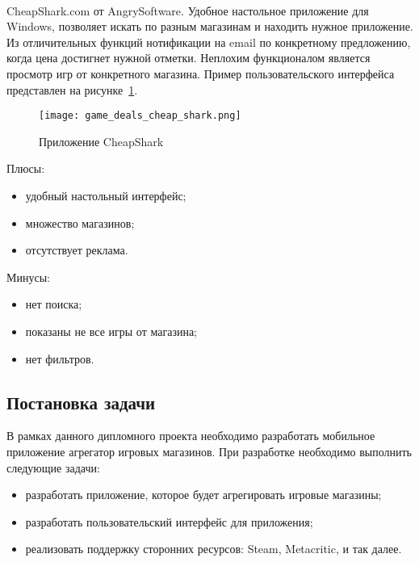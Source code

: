 ~\par
CheapShark.com от AngrySoftware. Удобное настольное приложение для Windows, позволяет искать по разным магазинам и находить нужное приложение. Из отличительных функций нотификации на email по конкретному предложению, когда цена достигнет нужной отметки. Неплохим функционалом является просмотр игр от конкретного магазина. Пример пользовательского интерфейса представлен на рисунке~\ref{fig:domain:game_cheap_shark}.

\begin{figure}[H]
  \centering
    \texttt{[image: game\_deals\_cheap\_shark.png]} 
    \caption{Приложение CheapShark}
    \label{fig:domain:game_cheap_shark}
 \end{figure}

Плюсы:
\begin{itemize}
  \item удобный настольный интерфейс;
  \item множество магазинов;
  \item отсутствует реклама.
\end{itemize}

 Минусы:
 \begin{itemize}
  \item нет поиска;
  \item показаны не все игры от магазина;
  \item нет фильтров.
\end{itemize}
 
\subsection{Постановка задачи}
В рамках данного дипломного проекта необходимо разработать мобильное приложение агрегатор игровых магазинов. При разработке необходимо выполнить следующие задачи:
\begin{itemize}
 \item разработать приложение, которое будет агрегировать игровые магазины;
 \item разработать пользовательский интерфейс для приложения;
 \item реализовать поддержку сторонних ресурсов: Steam, Metacritic, и так далее.
\end{itemize}
 
